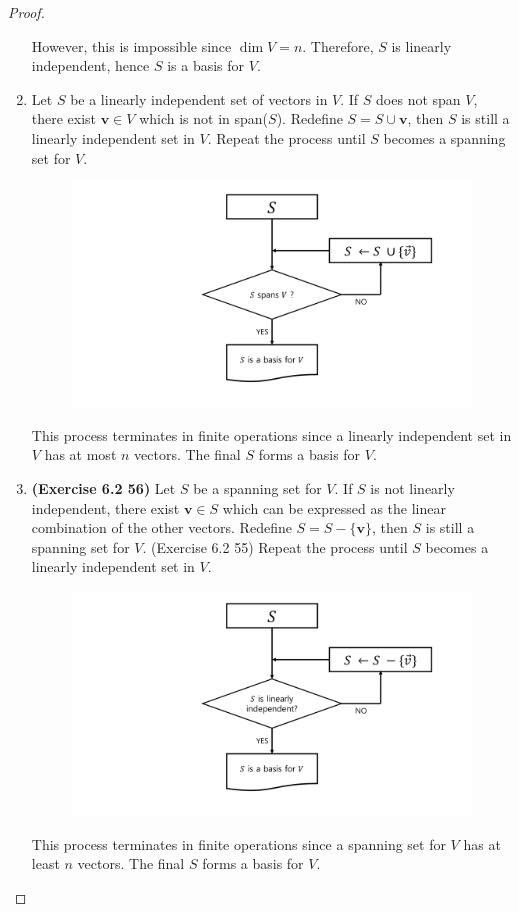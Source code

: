 \begin{proof}
\begin{enumerate}
		However, this is impossible since $\dim V = n$. Therefore, $S$ is linearly independent, hence $S$ is a basis for $V$.
		\item Let $S$ be a linearly independent set of vectors in $V$. If $S$ does not span $V$, there exist $\textbf{v} \in V$ which is not in span($S$). Redefine $S = S \cup \textbf{v}$, then $S$ is still a linearly independent set in $V$. Repeat the process until $S$ becomes a spanning set for $V$.
		\begin{figure}[H]
			\begin{center}
				\includegraphics[scale = 0.3]{PlusTheorem.pdf}
			\end{center}
		\end{figure}
		This process terminates in finite operations since a linearly independent set in $V$ has at most $n$ vectors. The final $S$ forms a basis for $V$.
		\item \textbf{(Exercise 6.2 56)} Let $S$ be a spanning set for $V$. If $S$ is not linearly independent, there exist $\textbf{v} \in S$ which can be expressed as the linear combination of the other vectors. Redefine $S = S - \{\textbf{v}\}$, then $S$ is still a spanning set for $V$. (Exercise 6.2 55) Repeat the process until $S$ becomes a linearly independent set in $V$.
		\begin{figure}[H]
			\begin{center}
				\includegraphics[scale = 0.3]{MinusTheorem.pdf}
			\end{center}
		\end{figure}
		This process terminates in finite operations since a spanning set for $V$ has at least $n$ vectors. The final $S$ forms a basis for $V$.
	\end{enumerate}
\end{proof}

